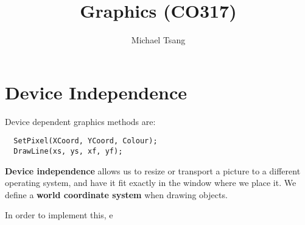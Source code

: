 \documentclass[11pt]{article}
\title{Graphics (CO317)}
\author{Michael Tsang}
\begin{document}
\maketitle

\section{Device Independence}
Device dependent graphics methods are:
\begin{verbatim}
  SetPixel(XCoord, YCoord, Colour);
  DrawLine(xs, ys, xf, yf);
\end{verbatim}

\textbf{Device independence} allows us to resize or transport a picture to a different operating system, and have it fit exactly in the window where we place it.
We define a \textbf{world coordinate system} when drawing objects.

In order to implement this, e 
\end{document}
